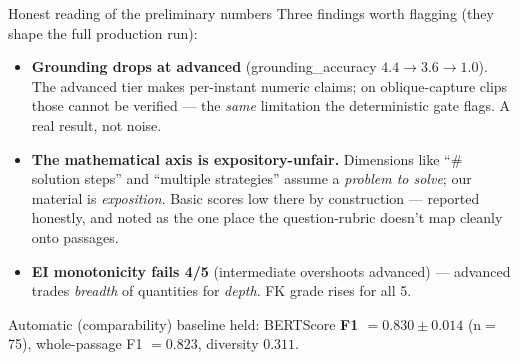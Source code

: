\documentclass[aspectratio=169,10pt]{beamer}
\newcommand{\hl}[1]{{\bfseries\color{cAccent}#1}}
\begin{document}
\begin{frame}{Honest reading of the preliminary numbers}
\small
Three findings worth flagging (they shape the full production run):
\begin{itemize}\setlength\itemsep{4pt}
  \item \hl{Grounding drops at advanced} (grounding\_accuracy $4.4\to3.6\to1.0$). The advanced
  tier makes per-instant numeric claims; on oblique-capture clips those cannot be verified ---
  the \emph{same} limitation the deterministic gate flags. A real result, not noise.
  \item \textbf{The mathematical axis is expository-unfair.} Dimensions like ``\# solution steps''
  and ``multiple strategies'' assume a \emph{problem to solve}; our material is \emph{exposition}.
  Basic scores low there by construction --- reported honestly, and noted as the one place the
  question-rubric doesn't map cleanly onto passages.
  \item \textbf{EI monotonicity fails 4/5} (intermediate overshoots advanced) --- advanced trades
  \emph{breadth} of quantities for \emph{depth}. FK grade rises for all 5.
\end{itemize}
\vspace{0.3em}
\begin{tcolorbox}[colback=cMeas!6,colframe=cMeas,boxsep=2pt,left=4pt,right=4pt]
\scriptsize Automatic (comparability) baseline held: BERTScore \textbf{F1 $=0.830\pm0.014$} (n$=$75),
whole-passage F1 $=0.823$, diversity $0.311$.
\end{tcolorbox}
\end{frame}
\end{document}
